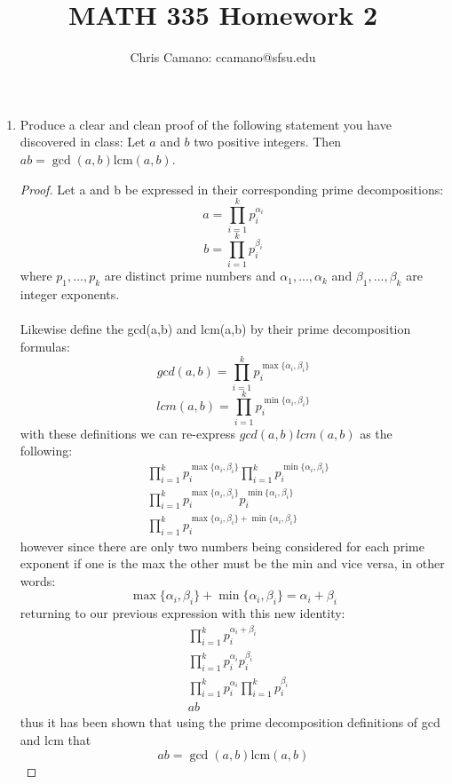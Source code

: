 \documentclass[11pt]{article}
\author{Chris Camano: ccamano@sfsu.edu}
\title{MATH 335  Homework 2 }
\date
\theoremstyle{definition}  %
\newcommand{\lcm}{\mathrm{lcm}}
\begin{document}
\maketitle

\begin{enumerate}
\item Produce a clear and clean proof of the following statement you have discovered in class:  Let $a$ and $b$ two positive integers. Then
$ab = \gcd(a,b) \lcm(a,b)$.
\begin{proof}
    Let a and b be expressed in their corresponding prime decompositions:
    \[
      a=\prod_{i=1}^kp_i^{\alpha_i}
    \]
    \[
      b=\prod_{i=1}^kp_i^{\beta_i}
    \]
    where $p_1,...,p_k$ are distinct prime numbers and $\alpha_1,...,\alpha_k$ and $\beta_1,...,\beta_k$ are integer exponents. \\\\
    Likewise define the gcd(a,b) and lcm(a,b) by their prime decomposition formulas:
    \[
      gcd(a,b)=\prod_{i=1}^kp_i^{\max\{\alpha_i,\beta_i\}}
    \]
    \[
      lcm(a,b)=\prod_{i=1}^kp_i^{\min\{\alpha_i,\beta_i\}}
    \]
    with these definitions we can re-express $gcd(a,b)lcm(a,b)$ as the following:
    \begin{align*}
      &\prod_{i=1}^kp_i^{\max\{\alpha_i,\beta_i\}}\prod_{i=1}^kp_i^{\min\{\alpha_i,\beta_i\}}\\
      &\prod_{i=1}^kp_i^{\max\{\alpha_i,\beta_i\}}p_i^{\min\{\alpha_i,\beta_i\}}\\
      &\prod_{i=1}^kp_i^{\max\{\alpha_i,\beta_i\}+{\min\{\alpha_i,\beta_i\}}}
    \end{align*}
    however since there are only two numbers being considered for each prime exponent if one is the max the other must be the min and vice versa, in other words:
    \[
      \max\{\alpha_i,\beta_i\}+\min\{\alpha_i,\beta_i\}=\alpha_i+\beta_i
    \]
    returning to our previous expression with this new identity:
    \begin{align*}
      &\prod_{i=1}^kp_i^{\alpha_i+\beta_i}\\
      &\prod_{i=1}^kp_i^{\alpha_i}p_i^{\beta_i}\\
      &\prod_{i=1}^kp_i^{\alpha_i}\prod_{i=1}^kp_i^{\beta_i}\\
      &ab
    \end{align*}
    thus it has been shown that using the prime decomposition definitions of gcd and lcm that
    \[
      ab = \gcd(a,b) \lcm(a,b)
    \]
\end{proof}

\end{enumerate}
\end{document}

